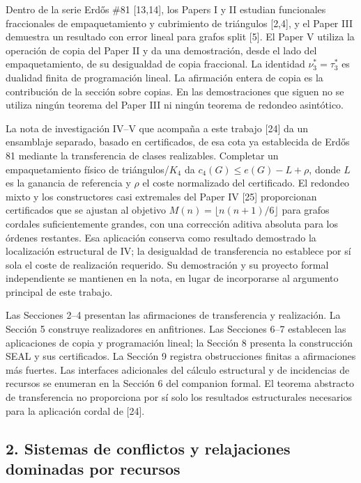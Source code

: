 \documentclass[spanish,11pt,a4paper]{article}
\begin{document}
Dentro de la serie Erdős \#81 {[}13,14{]}, los Papers I y II estudian
funcionales fraccionales de empaquetamiento y cubrimiento de triángulos
{[}2,4{]}, y el Paper III demuestra un resultado con error lineal para
grafos split {[}5{]}. El Paper V utiliza la operación de copia del Paper
II y da una demostración, desde el lado del empaquetamiento, de su
desigualdad de copia fraccional. La identidad \(\nu_3^*=\tau_3^*\) es
dualidad finita de programación lineal. La afirmación entera de copia es
la contribución de la sección sobre copias. En las demostraciones que
siguen no se utiliza ningún teorema del Paper III ni ningún teorema de
redondeo asintótico.

La nota de investigación IV--V que acompaña a este trabajo {[}24{]} da
un ensamblaje separado, basado en certificados, de esa cota ya
establecida de Erdős 81 mediante la transferencia de clases realizables.
Completar un empaquetamiento físico de triángulos/\(K_4\) da
\(c_4(G)\le e(G)-L+\rho\), donde \(L\) es la ganancia de referencia y
\(\rho\) el coste normalizado del certificado. El redondeo mixto y los
constructores casi extremales del Paper IV {[}25{]} proporcionan
certificados que se ajustan al objetivo \(M(n)=\lfloor n(n+1)/6\rfloor\)
para grafos cordales suficientemente grandes, con una corrección aditiva
absoluta para los órdenes restantes. Esa aplicación conserva como
resultado demostrado la localización estructural de IV; la desigualdad
de transferencia no establece por sí sola el coste de realización
requerido. Su demostración y su proyecto formal independiente se
mantienen en la nota, en lugar de incorporarse al argumento principal de
este trabajo.

Las Secciones 2--4 presentan las afirmaciones de transferencia y
realización. La Sección 5 construye realizadores en anfitriones. Las
Secciones 6--7 establecen las aplicaciones de copia y programación
lineal; la Sección 8 presenta la construcción SEAL y sus certificados.
La Sección 9 registra obstrucciones finitas a afirmaciones más fuertes.
Las interfaces adicionales del cálculo estructural y de incidencias de
recursos se enumeran en la Sección 6 del companion formal. El teorema
abstracto de transferencia no proporciona por sí solo los resultados
estructurales necesarios para la aplicación cordal de {[}24{]}.

\subsection{2. Sistemas de conflictos y relajaciones dominadas por
recursos}\label{sistemas-de-conflictos-y-relajaciones-dominadas-por-recursos}
\end{document}
